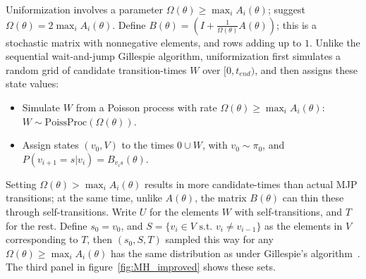 Uniformization involves a parameter $\Omega(\theta) \ge \max_i A_i(\theta)$; \cite{RaoTeh13} suggest $\Omega(\theta) = 2 \max_i A_i(\theta)$. 
Define $B(\theta) = \left(I +\frac{1}{\Omega(\theta)}A(\theta)\right)$; this is a stochastic matrix with nonnegative elements, and rows adding up to $1$.
Unlike the sequential wait-and-jump Gillespie algorithm, uniformization first simulates a random grid of candidate transition-times $W$ over $[0,t_{end})$, and then assigns these state values:
\begin{itemize}
  \item Simulate $W$ from a Poisson process with rate $\Omega(\theta) \ge \max_i A_i(\theta)$: 
    $W \sim \text{PoissProc}(\Omega(\theta))$.
  \item Assign states $(v_0,V)$ to the times $0 \cup W$, with $v_0 \sim \pi_0$, and $P(v_{i+1}=s|v_i) = B_{v_is}(\theta)$.
\end{itemize}
Setting $\Omega(\theta) > \max_i A_i(\theta)$ results in more candidate-times than actual MJP transitions; at the same time, unlike $A(\theta)$, the matrix $B(\theta)$ can thin these through self-transitions. 
Write $U$ for the elements $W$ with self-transitions, and $T$ for the rest.
Define $s_0=v_0$, and $S=\{v_i \in V \text{ s.t.\ } v_i \neq v_{i-1}\}$ as the elements in $V$ corresponding to $T$, then $(s_0,S,T)$ sampled this way for any $\Omega(\theta) \ge \max_i A_i(\theta)$
has the same distribution as under Gillespie's algorithm~\citep{Jen1953,RaoTeh13}. The third panel in figure~\ref{fig:MH_improved} shows these sets.

